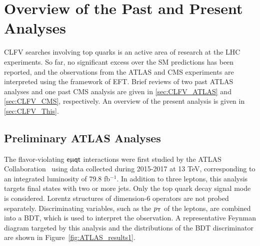 \chapter{Overview of the Past and Present Analyses}
\label{chap:History}

\ac{CLFV} searches involving top quarks is an active area of research at the \ac{LHC} experiments. So far, no significant excess over the \ac{SM} predictions has been reported, and the observations from the \ac{ATLAS} and \ac{CMS} experiments are interpreted using the framework of \ac{EFT}. Brief reviews of two past \ac{ATLAS} analyses and one past \ac{CMS} analysis are given in \autoref{sec:CLFV_ATLAS} and \autoref{sec:CLFV_CMS}, respectively. An overview of the present analysis is given in \autoref{sec:CLFV_This}.

\section{Preliminary ATLAS Analyses}
\label{sec:CLFV_ATLAS}

The flavor-violating $\textsf{e}\upmu\textsf{{q}t}$ interactions were first studied by the \ac{ATLAS} Collaboration~\cite{ATLAS-CONF-2018-044} using data collected during 2015-2017 at 13 TeV, corresponding to an integrated luminosity of 79.8 fb$^{-1}$. In addition to three leptons, this analysis targets final states with two or more jets. Only the top quark decay signal mode is considered. Lorentz structures of dimension-6 operators are not probed separately. Discriminating variables, such as the $p_{\textsf{T}}$ of the leptons, are combined into a \ac{BDT}, which is used to interpret the observation. A representative Feynman diagram targeted by this analysis and the distributions of the \ac{BDT} discriminator are shown in Figure~\ref{fig:ATLAS_results1}.

